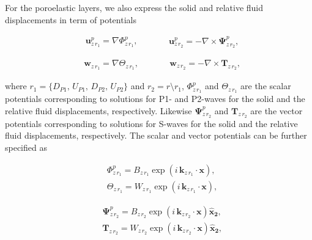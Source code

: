 \documentclass[draft]{agujournal2019}
\begin{document}
For the poroelastic layers, we also express the solid and relative fluid displacements in term of potentials
\begin{linenomath*}
\begin{equation}\label{Eq.a12}
\begin{aligned}
& \bm{u}_{z\,r_1}^p = \nabla \Phi^p_{z\,r_1},
\end{aligned}
\qquad
\begin{aligned}
& \bm{u}_{z\,r_2}^p = - \nabla \times \bm{\Psi}^p_{z\,r_2},
\end{aligned}
\end{equation}
\end{linenomath*}
\begin{linenomath*}
\begin{equation}\label{Eq.a13}
\begin{aligned}
& \bm{w}_{z\,r_1} = \nabla \Theta_{z\,r_1},
\end{aligned}
\qquad
\begin{aligned}
& \bm{w}_{z\,r_2} = -  \nabla \times \bm{T}_{z\,r_2},
\end{aligned}
\end{equation}
\end{linenomath*}
where  $r_1 = \{D_{P1},\,U_{P1},\,D_{P2},\,U_{P2}\}$ and $r_2=r\setminus r_1$, 
$\Phi^p_{z\,r_1}$ and $\Theta_{z\,r_1}$ are the scalar potentials corresponding to solutions for P1- and P2-waves for the solid and the relative fluid displacements, respectively. Likewise $\bm{\Psi}^p_{z\,r_2}$ and $ \bm{T}_{z\,r_2}$ are the vector potentials corresponding to solutions for S-waves for the solid and the relative fluid displacements, respectively. The scalar and vector potentials can be further specified as
\begin{linenomath*}
\begin{equation}\label{Eq.a14}
\begin{split}
&  \Phi^p_{z\,r_1} = B_{z\,r_1} \exp \left( i\, \bm{k}_{z\, r_1}\cdot \bm{x} \right), \\
& \Theta_{z\,r_1} =  W_{z\,r_1} \exp \left( i\, \bm{k}_{z\, r_1} \cdot \bm{x} \right), 
\end{split}
\end{equation}
\end{linenomath*}
\begin{linenomath*}
\begin{equation}\label{Eq.a15}
\begin{split}
& \bm{ \Psi}^p_{z\,r_2} = B_{z\,r_2} \exp \left( i\, \bm{k}_{z\, r_2}\cdot \bm{x} \right) \bm{\hat {x}_2}, \\
& \bm{T}_{z\,r_2} =  W_{z\,r_2} \exp \left( i\, \bm{k}_{z\, r_2} \cdot \bm{x} \right) \bm{\hat {x}_2}, 
\end{split}
\end{equation}
\end{linenomath*}
\end{document}
